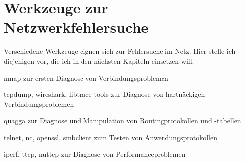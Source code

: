 \chapter{Werkzeuge zur Netzwerkfehlersuche}
\label{cha:netz-werkzeuge}

\begin{abstractsec}
  Verschiedene Werkzeuge eignen sich zur Fehlersuche im Netz. Hier stelle ich
  diejenigen vor, die ich in den nächsten Kapiteln einsetzen will.
\end{abstractsec}

\begin{notes}
\item[nmap] zur ersten Diagnose von Verbindungsproblemen
\item[tcpdump, wireshark, libtrace-tools] zur Diagnose von hartnäckigen
  Verbindungsproblemen
\item[quagga] zur Diagnose und Manipulation von Routingprotokollen und
  -tabellen
\item[telnet, nc, openssl, smbclient] zum Testen von Anwendungsprotokollen
\item[iperf, ttcp, nuttcp] zur Diagnose von Performanceproblemen
\end{notes}

